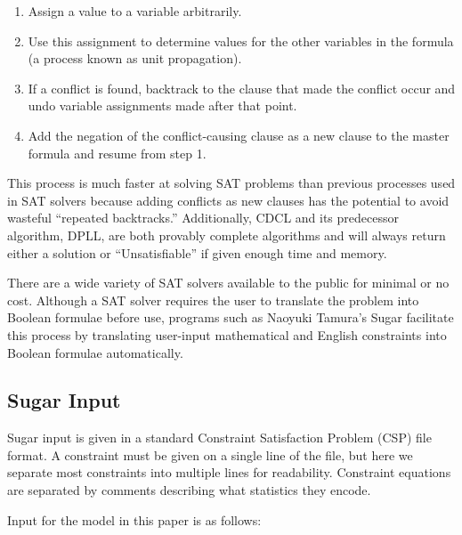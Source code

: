 \documentclass[runningheads]{llncs}
\begin{document}
\begin{enumerate}

\item Assign a value to a variable arbitrarily. 
\item Use this assignment to determine values for the other variables
  in the formula (a process known as unit propagation). 
\item If a conflict is found, backtrack to the clause that made the
  conflict occur and undo variable assignments made after that point. 
\item Add the negation of the conflict-causing clause as a new clause
  to the master formula and resume from step 1. 

\end{enumerate}

This process is much faster at solving SAT problems than previous
processes used in SAT solvers because adding conflicts as new clauses
has the potential to avoid wasteful ``repeated backtracks.''
Additionally, CDCL and its predecessor algorithm, DPLL, are both
provably complete algorithms and will always return either a solution
or ``Unsatisfiable'' if given enough time and memory.

There are a wide variety of SAT solvers available to the public for
minimal or no cost. Although a SAT solver requires the user to
translate the problem into Boolean formulae before use, programs such
as Naoyuki Tamura's Sugar facilitate this process by translating
user-input mathematical and English constraints into Boolean formulae
automatically.

\subsection{Sugar Input}

Sugar input is given in a standard Constraint Satisfaction Problem
(CSP) file format. A constraint must be given on a single line of the
file, but here we separate most constraints into multiple lines for
readability. Constraint equations are separated by comments describing
what statistics they encode.

Input for the model in this paper is as follows:


\end{document}
